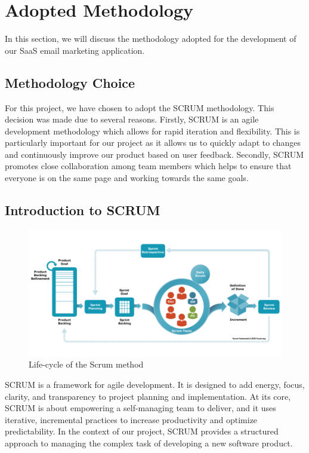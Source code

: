 \section{Adopted Methodology}

In this section, we will discuss the methodology adopted for the development of our SaaS email marketing application.

\subsection{Methodology Choice}

For this project, we have chosen to adopt the SCRUM methodology. This decision was made due to several reasons. Firstly, SCRUM is an agile development methodology which allows for rapid iteration and flexibility. This is particularly important for our project as it allows us to quickly adapt to changes and continuously improve our product based on user feedback. Secondly, SCRUM promotes close collaboration among team members which helps to ensure that everyone is on the same page and working towards the same goals.

\subsection{Introduction to SCRUM}

\begin{figure}[ht]
    \centering
    \includegraphics[width=0.7\linewidth]{Images//images/scrum.png}
    \caption{Life-cycle of the Scrum method}
    \label{fig:Life-cycle of the Scrum method}
\end{figure}

SCRUM is a framework for agile development. It is designed to add energy, focus, clarity, and transparency to project planning and implementation. At its core, SCRUM is about empowering a self-managing team to deliver, and it uses iterative, incremental practices to increase productivity and optimize predictability. In the context of our project, SCRUM provides a structured approach to managing the complex task of developing a new software product.

